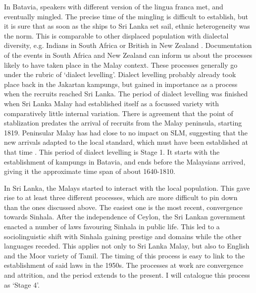 In Batavia, speakers with different version of the lingua franca met, and eventually mingled. The precise time of the mingling is difficult to establish, but it is sure that as soon as the ships to Sri Lanka set sail, ethnic heterogeneity was the norm. This is comparable to other displaced population with dialectal diversity, e.g. Indians in South Africa \citep{Mesthrie1993} or British in New Zealand \citep{Trudgill2004}. Documentation of the events in  South Africa and New Zealand can inform us about the processes likely to have taken place in the Malay context. These processes generally go under the rubric of `dialect levelling'. Dialect levelling probably already took place back in the Jakartan kampungs, but gained in importance as a process when the recruits reached Sri Lanka. The period of dialect levelling was finished when Sri Lanka Malay had established itself as a focussed variety with comparatively little internal variation. There is agreement that the point of stablization predates the arrival of recruits from the Malay peninsula, starting 1819. Peninsular Malay has had close to no impact on SLM, suggesting that the new arrivals adapted to the local standard, which must have been established at that time \citep[compare the `Founder Principle'][]{Mufwene1996}. This period of dialect levelling is Stage 1. It starts with the establishment of kampungs in Batavia, and ends before the Malaysians arrived, giving it the approximate time span of about 1640-1810. 

In Sri Lanka, the Malays started to interact with the local population. This gave rise to at least three different processes, which are more difficult to pin down than the ones discussed above. The easiest one is the most recent, convergence towards Sinhala. After the independence of Ceylon, the Sri Lankan government enacted a number of laws favouring Sinhala in public life. This led to a sociolinguistic shift with Sinhala gaining prestige and domains while the other languages receded. This applies not only to Sri Lanka Malay, but also to English and the Moor variety of Tamil. The timing of this process is easy to link to the establishment of said laws in the 1950s. The processes at work are convergence and attrition, and the period extends to the present. I will catalogue this process as `Stage 4'.


